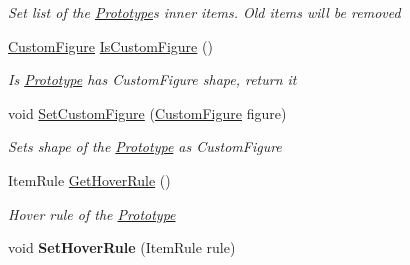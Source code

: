 \begin{DoxyCompactItemize}
\begin{DoxyCompactList}\small\item\em Set list of the \mbox{\hyperlink{class_space_v_i_l_1_1_prototype}{Prototype}}\textquotesingle{}s inner items. Old items will be removed \end{DoxyCompactList}\item 
\mbox{\hyperlink{class_space_v_i_l_1_1_decorations_1_1_custom_figure}{Custom\+Figure}} \mbox{\hyperlink{class_space_v_i_l_1_1_prototype_ad370acd0c610b7a7dc6d402b0cccf09a}{Is\+Custom\+Figure}} ()
\begin{DoxyCompactList}\small\item\em Is \mbox{\hyperlink{class_space_v_i_l_1_1_prototype}{Prototype}} has Custom\+Figure shape, return it ~\newline
\end{DoxyCompactList}\item 
void \mbox{\hyperlink{class_space_v_i_l_1_1_prototype_a7c6bb62d8c795366532c7295b2b71d30}{Set\+Custom\+Figure}} (\mbox{\hyperlink{class_space_v_i_l_1_1_decorations_1_1_custom_figure}{Custom\+Figure}} figure)
\begin{DoxyCompactList}\small\item\em Sets shape of the \mbox{\hyperlink{class_space_v_i_l_1_1_prototype}{Prototype}} as Custom\+Figure \end{DoxyCompactList}\item 
Item\+Rule \mbox{\hyperlink{class_space_v_i_l_1_1_prototype_af90d17511ea27379d9510606938a0443}{Get\+Hover\+Rule}} ()
\begin{DoxyCompactList}\small\item\em Hover rule of the \mbox{\hyperlink{class_space_v_i_l_1_1_prototype}{Prototype}} \end{DoxyCompactList}\item 
\mbox{\label{class_space_v_i_l_1_1_prototype_a439ef362241c2da17cf0c5a4c49d4888}} 
void {\bfseries Set\+Hover\+Rule} (Item\+Rule rule)
\end{DoxyCompactItemize}
